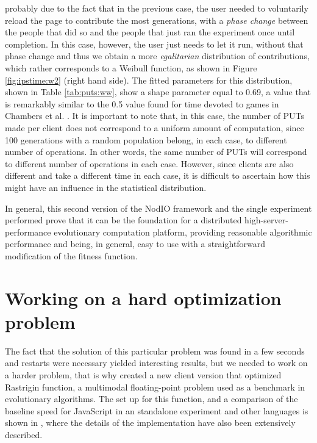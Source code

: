 \documentclass[journal,onecolumn]{IEEEtran}
\begin{document}
probably due to the fact that in the previous case, the user needed to
voluntarily reload the page to contribute the most generations, with a
{\em phase change} between the people that did so and the people that
just ran the experiment once until completion. In this case, however, the
user just needs to let it run, without that phase change and thus we obtain a
more {\em egalitarian} distribution of contributions, which rather
corresponds to a Weibull function, as shown in Figure
\ref{fig:ipstime:w2} (right hand side). The fitted parameters for this
distribution, shown in Table \ref{tab:puts:ww}, show a shape parameter
equal to 0.69, a value that is remarkably similar to the 0.5 value
found for time devoted to games in Chambers et
al. \cite{chambers2005measurement}. It is important to note that, in
this case, the number of PUTs made per client does not correspond to a
uniform amount of computation, since 100 generations with a random
population belong, in each case, to different number of
operations. In other words, the same number of PUTs will correspond to
different number of operations in each case. However, since clients
are also different and take a different time in each case, it is
difficult to ascertain how this might have an influence in the
statistical distribution.

In general, this second version of the {\sf NodIO} framework and the
single experiment performed prove that it can be the foundation for a distributed
high-server-performance evolutionary computation platform,
providing reasonable algorithmic performance and being, in general,
easy to use with a straightforward modification of the fitness
function. 

\section{Working on a hard optimization problem}
\label{sec:rastrigin}

The fact that the solution of this particular problem was found in a
few seconds and restarts were necessary yielded interesting results,
but we needed to work on a harder problem, that is why created a new
client version that optimized Rastrigin function, a multimodal
floating-point problem used as a benchmark in evolutionary
algorithms. The set up for this function, and a comparison of the
baseline speed for JavaScript in an standalone experiment and other
languages is shown in \cite{2016arXiv160101607M}, where the details of
the implementation have also been extensively described. 
\end{document}
